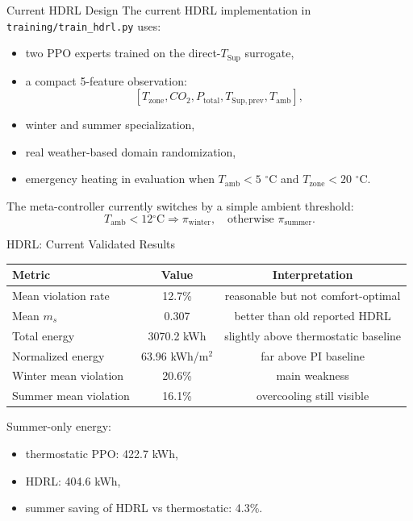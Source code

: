 \documentclass[aspectratio=169,11pt]{beamer}
\newcommand{\degc}{\ensuremath{^\circ\mathrm{C}}}
\begin{document}
\begin{frame}{Current HDRL Design}
  The current HDRL implementation in \texttt{training/train\_hdrl.py} uses:
  \begin{itemize}
    \item two PPO experts trained on the direct-$T_{\mathrm{Sup}}$ surrogate,
    \item a compact 5-feature observation:
    \[
      [T_{\mathrm{zone}}, CO_2, P_{\mathrm{total}}, T_{\mathrm{Sup,prev}}, T_{\mathrm{amb}}],
    \]
    \item winter and summer specialization,
    \item real weather-based domain randomization,
    \item emergency heating in evaluation when $T_{\mathrm{amb}} < 5$ \degc{} and $T_{\mathrm{zone}} < 20$ \degc{}.
  \end{itemize}

  The meta-controller currently switches by a simple ambient threshold:
  \[
    T_{\mathrm{amb}} < 12 \degc{} \Rightarrow \pi_{\mathrm{winter}}, \quad \text{otherwise } \pi_{\mathrm{summer}}.
  \]
\end{frame}

\begin{frame}{HDRL: Current Validated Results}
  \small
  \begin{tabular}{lcc}
    \toprule
    Metric & Value & Interpretation \\
    \midrule
    Mean violation rate & 12.7\% & reasonable but not comfort-optimal \\
    Mean $m_s$ & 0.307 & better than old reported HDRL \\
    Total energy & 3070.2 kWh & slightly above thermostatic baseline \\
    Normalized energy & 63.96 kWh/m$^2$ & far above PI baseline \\
    Winter mean violation & 20.6\% & main weakness \\
    Summer mean violation & 16.1\% & overcooling still visible \\
    \bottomrule
  \end{tabular}

  \vspace{0.75em}
  Summer-only energy:
  \begin{itemize}
    \item thermostatic PPO: 422.7 kWh,
    \item HDRL: 404.6 kWh,
    \item summer saving of HDRL vs thermostatic: 4.3\%.
  \end{itemize}
\end{frame}
\end{document}

